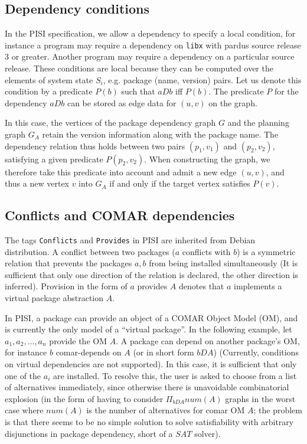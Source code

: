 \documentclass[a4paper,11pt]{article}
\begin{document}
\subsection{Dependency conditions}

In the PISI specification, we allow a dependency to specify a local
condition, for instance a program may require a dependency on
\texttt{libx} with pardus source release $3$ or greater. Another
program may require a dependency on a particular source release. These
conditions are local because they can be computed over the elements of
system state $S_i$, e.g. package (name, version) pairs. Let us denote this
condition by a predicate $P(b)$ such that $aDb$ iff $P(b)$.  The
predicate $P$ for the dependency $aDb$ can be stored as edge data for
$(u,v)$ on the graph.

In this case, the vertices of the package dependency graph $G$ and the
planning graph $G_A$ retain the version information along with the
package name. The dependency relation thus holds between two pairs
$(p_1,v_1)$ and $(p_2,v_2)$, satisfying a given predicate
$P(p_2,v_2)$. When constructing the graph, we therefore take this
predicate into account and admit a new edge $(u,v)$, and thus a new
vertex $v$ into $G_A$ if and only if the target vertex satisfies
$P(v)$.

\subsection{Conflicts and COMAR dependencies}

The tags \texttt{Conflicts} and \texttt{Provides} in PISI are
inherited from Debian distribution. A conflict between two packages
($a$ conflicts with $b$) is a symmetric relation that prevents the
packages $a,b$ from being installed simultaneously (It is
sufficient that only one direction of the relation is declared, the
other direction is inferred). Provision in the form of $a$ provides $A$
denotes that $a$ implements a virtual package abstraction $A$.

In PISI, a package can provide an object of a COMAR Object Model (OM),
and is currently the only model of a ``virtual package''. In the
following example, let $a_1,a_2,\ldots,a_n$ provide the OM $A$. A package
can depend on another package's OM, for instance $b$ comar-depends on
$A$ (or in short form $bDA$) (Currently, conditions on virtual
dependencies are not supported). In this case, it is sufficient that
only one of the $a_i$ are installed. To resolve this, the user is
asked to choose from a list of alternatives immediately, since
otherwise there is unavoidable combinatorial explosion (in the form of
having to consider $\Pi_{bDA}num(A)$ graphs in the worst case where
$num(A)$ is the number of alternatives for comar OM $A$; the problem
is that there seems to be no simple solution to solve satisfiability
with arbitrary disjunctions in package dependency, short of a $SAT$
solver).
\end{document}
